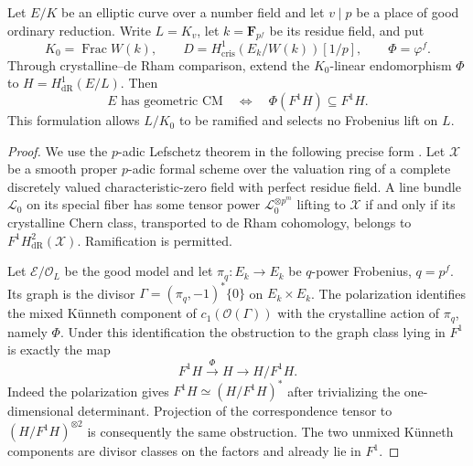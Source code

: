 \begin{theorem}\label{thm:one-prime-c}
Let $E/K$ be an elliptic curve over a number field and let $v\mid p$
be a place of good ordinary reduction.  Write $L=K_v$, let
$k=\mathbf F_{p^f}$ be its residue field, and put
\[
 K_0=\operatorname{Frac}W(k),\qquad
 D=H^1_{\mathrm{cris}}(E_k/W(k))[1/p],\qquad\Phi=\varphi^f.
\]
Through crystalline--de Rham comparison, extend the $K_0$-linear
endomorphism $\Phi$ to $H=H^1_{\mathrm{dR}}(E/L)$.  Then
\[
 E\text{ has geometric CM}
 \quad\Longleftrightarrow\quad
                    \Phi(F^1H)\subseteq F^1H.
\]
This formulation allows $L/K_0$ to be ramified and selects no
Frobenius lift on $L$.
\end{theorem}
\begin{proof}
We use the $p$-adic Lefschetz theorem in the following precise form
\cite[Theorem 4.24]{MaulikPoonen}.  Let $\mathcal X$ be a smooth
proper $p$-adic formal scheme over the valuation ring of a complete
discretely valued characteristic-zero field with perfect residue
field.  A line bundle $\mathcal L_0$ on its special fiber has some
tensor power $\mathcal L_0^{\otimes p^m}$ lifting to
$\mathcal X$ if and only if its crystalline Chern class, transported
to de Rham cohomology, belongs to $F^1H^2_{\mathrm{dR}}(\mathcal X)$.
Ramification is permitted.

Let $\mathcal E/\mathcal O_L$ be the good model and let
$\pi_q:E_k\to E_k$ be $q$-power Frobenius, $q=p^f$.
Its graph is the divisor
$\Gamma=(\pi_q,-1)^*\{0\}$ on $E_k\times E_k$.
The polarization identifies the mixed K\"unneth component of
$c_1(\mathcal O(\Gamma))$ with the crystalline action of
$\pi_q$, namely $\Phi$.  Under this identification the obstruction
to the graph class lying in $F^1$ is exactly the map
\begin{equation}\label{eq:rev:frobenius-obstruction}
                 F^1H\xrightarrow{\ \Phi\ }H
                           \longrightarrow H/F^1H.
\end{equation}
Indeed the polarization gives $F^1H\simeq(H/F^1H)^*$ after
trivializing the one-dimensional determinant.  Projection of the
correspondence tensor to $(H/F^1H)^{\otimes2}$ is consequently
the same obstruction.  The two unmixed K\"unneth components
are divisor classes on the factors and already lie in $F^1$.


\end{proof}
